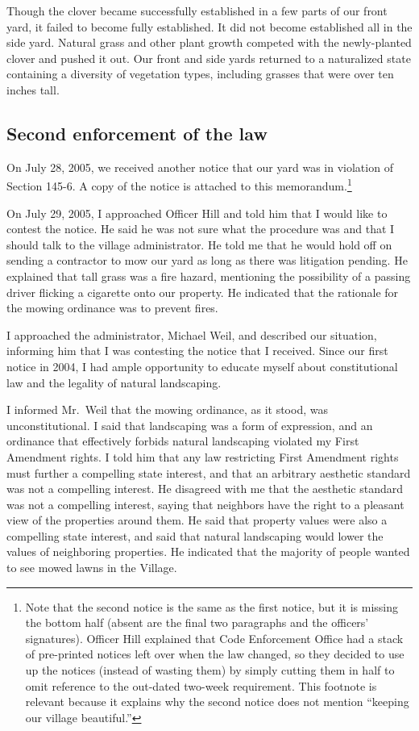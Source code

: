 \documentclass[12pt]{article}
\begin{document}
Though the clover became successfully established in a few parts of our front yard, it failed to become fully established.
It did not become established all in the side yard.
Natural grass and other plant growth competed with the newly-planted clover and pushed it out.
Our front and side yards returned to a naturalized state containing a diversity of vegetation types, including grasses that were over ten inches tall.

\subsection{Second enforcement of the law}

On July 28, 2005, we received another notice that our yard was in violation of Section 145-6.
A copy of the notice is attached to this memorandum.\footnote{
Note that the second notice is the same as the first notice, but it is missing the bottom half (absent are the final two paragraphs and the officers' signatures).
Officer Hill explained that Code Enforcement Office had a stack of pre-printed notices left over when the law changed, so they decided to use up the notices (instead of wasting them) by simply cutting them in half to omit reference to the out-dated two-week requirement.
This footnote is relevant because it explains why the second notice does not mention ``keeping our village beautiful.''} 

On July 29, 2005, I approached Officer Hill and told him that I would like to contest the notice.
He said he was not sure what the procedure was and that I should talk to the village administrator.
He told me that he would hold off on sending a contractor to mow our yard as long as there was litigation pending.
He explained that tall grass was a fire hazard, mentioning the possibility of a passing driver flicking a cigarette onto our property.
He indicated that the rationale for the mowing ordinance was to prevent fires.



I approached the administrator, Michael Weil, and described our situation, informing him that I was contesting the notice that I received.
Since our first notice in 2004, I had ample opportunity to educate myself about constitutional law and the legality of natural landscaping.

I informed Mr.\ Weil that the mowing ordinance, as it stood, was unconstitutional.
I said that landscaping was a form of expression, and an ordinance that effectively forbids natural landscaping violated my First Amendment rights.
I told him that any law restricting First Amendment rights must further a compelling state interest, and that an arbitrary aesthetic standard was not a compelling interest.
He disagreed with me that the aesthetic standard was not a compelling interest, saying that neighbors have the right to a pleasant view of the properties around them.
He said that property values were also a compelling state interest, and said that natural landscaping would lower the values of neighboring properties.
He indicated that the majority of people wanted to see mowed lawns in the Village.
\end{document}
